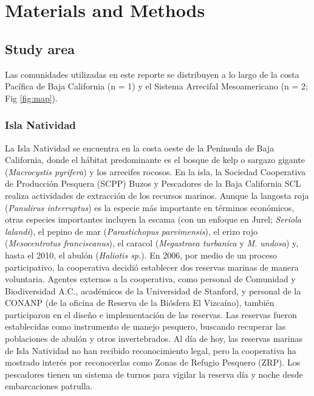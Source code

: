 \documentclass{frontiersSCNS}
\begin{document}
\section{Materials and Methods}\label{materials-and-methods}

\subsection{Study area}\label{study-area}

Las comunidades utilizadas en este reporte se distribuyen a lo largo de
la costa Pacífica de Baja California (n = 1) y el Sistema Arrecifal
Mesoamericano (n = 2; Fig \ref{fig:map}).

\subsubsection{Isla Natividad}\label{isla-natividad}

La Isla Natividad se encuentra en la costa oeste de la Península de Baja
California, donde el hábitat predominante es el bosque de kelp o sargazo
gigante (\emph{Macrocystis pyrifera}) y los arrecifes rocosos. En la
isla, la Sociedad Cooperativa de Producción Pesquera (SCPP) Buzos y
Pescadores de la Baja California SCL realiza actividades de extracción
de los recursos marinos. Aunque la langosta roja (\emph{Panulirus
interruptus}) es la especie más importante en términos económicos, otras
especies importantes incluyen la escama (con un enfoque en Jurel;
\emph{Seriola lalandi}), el pepino de mar (\emph{Parastichopus
parvimensis}), el erizo rojo (\emph{Mesocentrotus franciscanus}), el
caracol (\emph{Megastraea turbanica} y \emph{M. undosa}) y, hasta el
2010, el abulón (\emph{Haliotis sp.}). En 2006, por medio de un proceso
participativo, la cooperativa decidió establecer dos reservas marinas de
manera voluntaria. Agentes externos a la cooperativa, como personal de
Comunidad y Biodiversidad A.C., académicos de la Universidad de
Stanford, y personal de la CONANP (de la oficina de Reserva de la
Biósfera El Vizcaíno), también participaron en el diseño e
implementación de las reservas. Las reservas fueron establecidas como
instrumento de manejo pesquero, buscando recuperar las poblaciones de
abulón y otros invertebrados. Al día de hoy, las reservas marinas de
Isla Natividad no han recibido reconocimiento legal, pero la cooperativa
ha mostrado interés por reconocerlas como Zonas de Refugio Pesquero
(ZRP). Los pescadores tienen un sistema de turnos para vigilar la
reserva día y noche desde embarcaciones patrulla.
\end{document}
